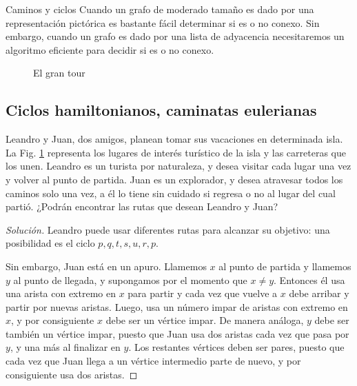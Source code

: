 \begin{section}{Caminos y ciclos}
Cuando un grafo de moderado tamaño es dado por una representación pictórica es bastante fácil determinar si es o no conexo. Sin embargo, cuando un grafo es dado por una lista de adyacencia necesitaremos un algoritmo eficiente para decidir si es o no conexo. 

\begin{figure}[ht]
    \begin{center}
    \end{center}
    \caption{El gran tour} \label{f5.7}
\end{figure}

\subsection*{Ciclos hamiltonianos, caminatas eulerianas}

\begin{ejemplo}\label{chunner} Leandro y Juan, dos amigos, planean tomar sus vacaciones en determinada isla. La Fig. \ref{f5.7} representa los lugares de interés turístico de la isla y las carreteras que los unen. Leandro es un turista por naturaleza, y desea visitar cada lugar una vez y volver al punto de partida. Juan es un explorador, y desea atravesar todos los caminos solo una vez, a él lo tiene sin cuidado si regresa o no al lugar del cual partió. ¿Podrán encontrar las rutas que desean Leandro y Juan?
\begin{proof}[Solución] Leandro puede usar diferentes rutas para alcanzar su objetivo: una posibilidad es el ciclo $p,q,t,s,u,r,p$.
    
    Sin embargo, Juan está en un apuro. Llamemos $x$ al punto de partida y llamemos $y$ al punto de llegada, y supongamos por el momento que $x \not= y$. Entonces él usa una arista con extremo en $x$ para partir y cada vez que vuelve a $x$ debe arribar y partir por nuevas aristas. Luego, usa un número impar de aristas con extremo en $x$, y por consiguiente $x$ debe ser un vértice impar. De manera análoga, $y$ debe ser también un vértice impar, puesto que Juan usa dos aristas cada vez que pasa por $y$, y una más al finalizar en $y$. Los restantes vértices deben ser pares, puesto que cada vez que Juan llega a un vértice intermedio parte de nuevo, y por consiguiente usa dos aristas.
    

\end{proof}
\end{ejemplo}
\end{section}

